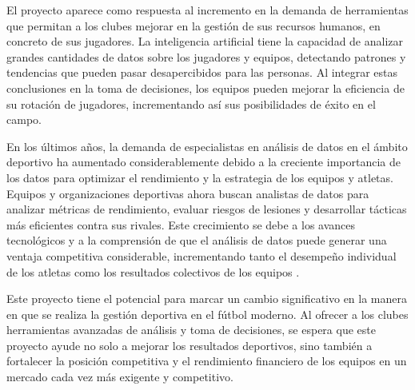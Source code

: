 El proyecto aparece como respuesta al incremento en la demanda de herramientas que permitan a los clubes mejorar en la gestión de sus recursos humanos, en concreto de sus jugadores. La inteligencia artificial tiene la capacidad de analizar grandes cantidades de datos sobre los jugadores y equipos, detectando patrones y tendencias que pueden pasar desapercibidos para las personas. Al integrar estas conclusiones en la toma de decisiones, los equipos pueden mejorar la eficiencia de su rotación de jugadores, incrementando así sus posibilidades de éxito en el campo.

En los últimos años, la demanda de especialistas en análisis de datos en el ámbito deportivo ha aumentado considerablemente debido a la creciente importancia de los datos para optimizar el rendimiento y la estrategia de los equipos y atletas. Equipos y organizaciones deportivas ahora buscan analistas de datos para analizar métricas de rendimiento, evaluar riesgos de lesiones y desarrollar tácticas más eficientes contra sus rivales. Este crecimiento se debe a los avances tecnológicos y a la comprensión de que el análisis de datos puede generar una ventaja competitiva considerable, incrementando tanto el desempeño individual de los atletas como los resultados colectivos de los equipos \cite{incremento-ia-deporte}.

Este proyecto tiene el potencial para marcar un cambio significativo en la manera en que se realiza la gestión deportiva en el fútbol moderno. Al ofrecer a los clubes herramientas avanzadas de análisis y toma de decisiones, se espera que este proyecto ayude no solo a mejorar los resultados deportivos, sino también a fortalecer la posición competitiva y el rendimiento financiero de los equipos en un mercado cada vez más exigente y competitivo.













